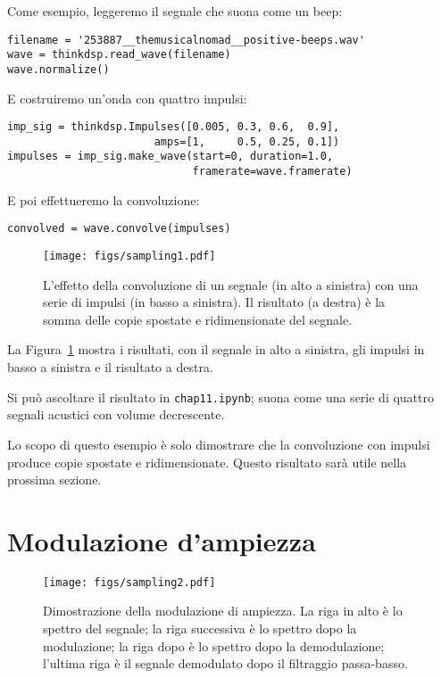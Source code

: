 \documentclass[12pt]{book} \usepackage[width=5.5in,height=8.5in, hmarginratio=3:2,vmarginratio=1:1]{geometry}
\begin{document}
Come esempio, leggeremo il segnale che suona come un beep:

\begin{verbatim} 
filename = '253887__themusicalnomad__positive-beeps.wav'
wave = thinkdsp.read_wave(filename)
wave.normalize()
 \end{verbatim} 

E costruiremo un'onda con quattro impulsi:

\begin{verbatim} 
imp_sig = thinkdsp.Impulses([0.005, 0.3, 0.6,  0.9],
                       amps=[1,     0.5, 0.25, 0.1])
impulses = imp_sig.make_wave(start=0, duration=1.0,
                             framerate=wave.framerate)
 \end{verbatim} 

E poi effettueremo la convoluzione:

\begin{verbatim} 
convolved = wave.convolve(impulses)
 \end{verbatim} 

\begin{figure} 

\centerline{\texttt{[image: figs/sampling1.pdf]}} \caption{L'effetto della convoluzione di un segnale (in alto a sinistra) con una serie di impulsi (in basso a sinistra). Il risultato (a destra) è la somma delle copie spostate e ridimensionate del segnale.} \label{fig.sampling1} \end{figure} 

La Figura~\ref{fig.sampling1} mostra i risultati, con il segnale in alto a sinistra, gli impulsi in basso a sinistra e il risultato a destra.

Si può ascoltare il risultato in {\tt chap11.ipynb}; suona come una serie di quattro segnali acustici con volume decrescente.

Lo scopo di questo esempio è solo dimostrare che la convoluzione con impulsi produce copie spostate e ridimensionate. Questo risultato sarà utile nella prossima sezione.

\section{Modulazione d'ampiezza} \label{am} 

\begin{figure} 

\centerline{\texttt{[image: figs/sampling2.pdf]}} \caption{Dimostrazione della modulazione di ampiezza. La riga in alto è lo spettro del segnale; la riga successiva è lo spettro dopo la modulazione; la riga dopo è lo spettro dopo la demodulazione; l'ultima riga è il segnale demodulato dopo il filtraggio passa-basso.} \label{fig.sampling2} \end{figure} 
\end{document}
